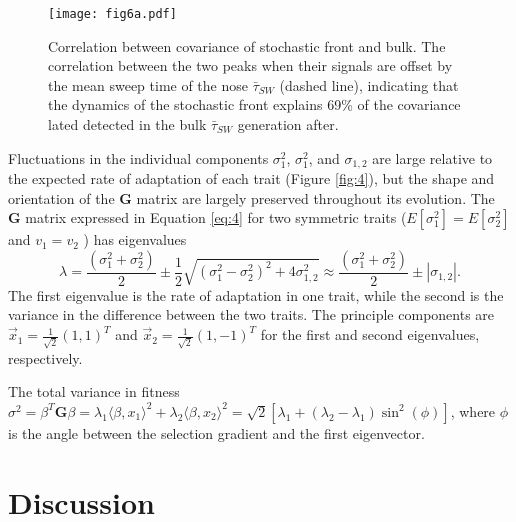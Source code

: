 \documentclass[9pt,twocolumn,twoside]{gsajnl}
\newcommand{\G}{\textbf{G }}
\begin{document}
\begin{figure}[!ht]
\texttt{[image: fig6a.pdf]}
\caption{Correlation between covariance of stochastic front and bulk. The correlation between the two peaks when their signals are offset by the mean sweep time of the nose $\bar{\tau}_{SW}$ (dashed line), indicating that the dynamics of the stochastic front explains 69\% of the covariance lated detected in the bulk $\bar{\tau}_{SW}$ generation after.}\label{fig:6}
% 
% 
\end{figure}
Fluctuations in the individual components $\sigma_1^2$, $\sigma_1^2$, and $\sigma_{1,2}$ are large relative to the expected rate of adaptation of each trait (Figure \ref{fig:4}), but the shape and orientation of the \G matrix are largely preserved throughout its evolution. The \G matrix expressed in Equation \ref{eq:4} for two symmetric traits ($E[\sigma_1^2] = E[ \sigma_2^2]$ and $v_1 = v_2 $ ) has eigenvalues
\[ \lambda =  \frac{\left(\sigma_1^2+ \sigma_2^2\right)}{2}\pm \frac{1}{2} \sqrt{ (\sigma_1^2 -\sigma_2^2)^2 +4 \sigma_{1,2}^2 } \approx \frac{\left(\sigma_1^2+ \sigma_2^2\right)}{2} \pm  |\sigma_{1,2}|.  \]
The first eigenvalue is the rate of adaptation in one trait, while the second is the variance in the difference between the two traits. The principle components are $\vec{x}_1 = \frac{1}{\sqrt{2}}(1,1)^T$ and $\vec{x}_2 =\frac{1}{\sqrt{2}}(1,-1)^T$ for the first and second eigenvalues, respectively.  

The total variance in fitness $\sigma^2 = \beta^T \textbf{G} \beta = \lambda_1 \langle \beta,x_1 \rangle^2+ \lambda_2 \langle \beta,x_2 \rangle^2  = \sqrt{2}[\lambda_1 + (\lambda_2 -\lambda_1)\sin^2(\phi)]$, where $\phi $ is the angle between the selection gradient and the first eigenvector. 

\section*{Discussion}

% 
% 
% 
%
\end{document}

